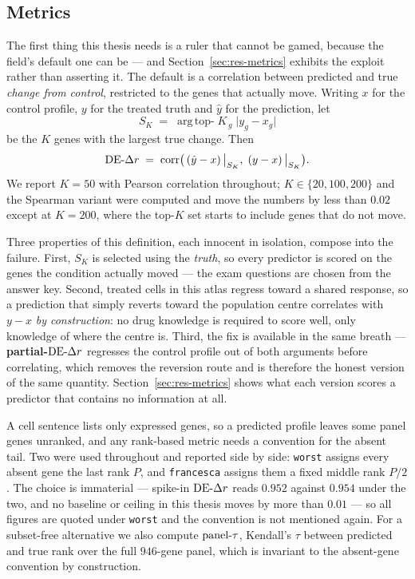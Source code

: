\subsection{Metrics}
\label{sec:methods-metrics}

The first thing this thesis needs is a ruler that cannot be gamed, because the field's default one
can be --- and Section~\ref{sec:res-metrics} exhibits the exploit rather than asserting it. The
default is a correlation between predicted and true \emph{change from control}, restricted to the
genes that actually move. Writing $x$ for the control profile, $y$ for the treated truth and
$\hat{y}$ for the prediction, let
\begin{equation}
  S_K \;=\; \operatorname*{arg\,top-}K_{\,g} \; \lvert y_g - x_g \rvert
\end{equation}
be the $K$ genes with the largest true change. Then
\begin{equation}
  \textrm{DE-}\Delta r \;=\; \operatorname{corr}\!\big( \left(\hat{y} - x\right)\big|_{S_K}, \;
                                          \left(y - x\right)\big|_{S_K} \big).
\end{equation}
We report $K=50$ with Pearson correlation throughout; $K \in \{20, 100, 200\}$ and the Spearman
variant were computed and move the numbers by less than $0.02$ except at $K=200$, where the
top-$K$ set starts to include genes that do not move.

Three properties of this definition, each innocent in isolation, compose into the failure. First,
$S_K$ is selected using the \emph{truth}, so every predictor is scored on the genes the condition
actually moved --- the exam questions are chosen from the answer key. Second, treated cells in this
atlas regress toward a shared response, so a prediction that simply reverts toward the population
centre correlates with $y - x$ \emph{by construction}: no drug knowledge is required to score well,
only knowledge of where the centre is. Third, the fix is available in the same breath ---
\textbf{partial-}$\textrm{DE-}\Delta r$ regresses the control profile out of both arguments before correlating,
which removes the reversion route and is therefore the honest version of the same quantity.
Section~\ref{sec:res-metrics} shows what each version scores a predictor that contains no
information at all.

A cell sentence lists only expressed genes, so a predicted profile leaves some panel genes
unranked, and any rank-based metric needs a convention for the absent tail. Two were used
throughout and reported side by side: \texttt{worst} assigns every absent gene the last rank $P$,
and \texttt{francesca} assigns them a fixed middle rank $P/2$. The choice is immaterial --- spike-in
$\textrm{DE-}\Delta r$ reads $0.952$ against $0.954$ under the two, and no baseline or ceiling in this thesis
moves by more than $0.01$ --- so all figures are quoted under \texttt{worst} and the convention is
not mentioned again. For a subset-free alternative we also compute $\textrm{panel-}\tau$, Kendall's $\tau$
between predicted and true rank over the full $946$-gene panel, which is invariant to the
absent-gene convention by construction.

